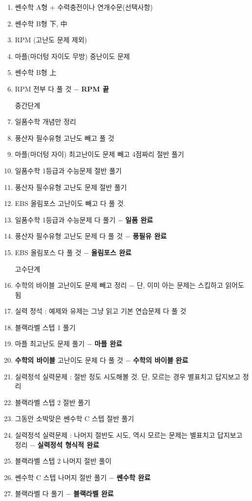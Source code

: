 \begin{enumerate}
    \item 쎈수학 A형 + 수력충전이나 연개수문(선택사항)
    \item 쎈수학 B형 下, 中
    \item RPM (고난도 문제 제외)
    \item 마플(마더텅 자이도 무방) 중난이도 문제
    \item 쎈수학 B형 上
    \item RPM 전부 다 풀 것 $-$ \textbf{RPM 끝}

\vspace{5mm}

중간단계
\vspace{5mm}

    \item  일품수학 개념만 정리
    \item  풍산자 필수유형 고난도 빼고 풀 것
    \item  마플(마더텅 자이) 최고난이도 문제 빼고 4점짜리 절반 풀기
    \item  일품수학 1등급과 수능문제 절반 풀기
    \item  풍산자 필수유형 고난도 문제 절반 풀기
    \item  EBS 올림포스 고난이도 빼고 다 풀 것.
    \item  일품수학 1등급과 수능문제 다 풀기 $-$ \textbf{일품 완료}
    \item  풍산자 필수유형 고난도 문제 다 풀 것 $-$ \textbf{풍필유 완료}
    \item  EBS 올림포스 다 풀 것 $-$ \textbf{올림포스 완료}
\vspace{5mm}

고수단계

\vspace{5mm}

    \item 수학의 바이블 고난이도 문제 빼고 정리 $-$ 단, 이미 아는 문제는 스킵하고 읽어도 됨
    \item 실력 정석 : 예제와 유제는 그냥 읽고 기본 연습문제 다 풀 것
    \item 블랙라벨 스텝 1 풀기
    \item 마플 최고난도 문제 풀기 $-$ \textbf{마플 완료}
    \item \textbf{수학의 바이블} 고난이도 문제 다 풀 것 $-$ \textbf{수학의 바이블} \textbf{완료}
    \item 실력정석 실력문제 : 절반 정도 시도해볼 것. 단, 모르는 경우 별표치고 답지보고 정리
    \item 블랙라벨 스텝 2 절반 풀기
    \item 그동안 소박맞은 쎈수학 C 스텝 절반 풀기
    \item 실력정석 실력문제 : 나머지 절반도 시도, 역시 모르는 문제는 별표치고 답지보고 정리 $-$ \textbf{실력정석 형식적 완료}
    \item 블랙라벨 스텝 2 나머지 절반 풀이
    \item 쎈수학 C 스텝 나머지 절반 풀기 $-$ \textbf{쎈수학 완료}
    \item 블랙라벨 다 풀기 $-$ \textbf{블랙라벨 완료}
    

\end{enumerate}
